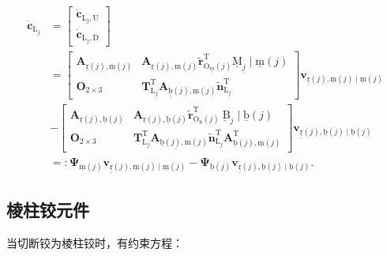 \[
\begin{aligned}
\dot{\boldsymbol{c}}_{\mathrm{L}_{j}} & =\left[\begin{array}{c}
\dot{\boldsymbol{c}}_{\mathrm{L}_{j}, \mathrm{U}} \\
\dot{\boldsymbol{c}}_{\mathrm{L}_{j}, \mathrm{D}}
\end{array}\right] \\
& =\left[\begin{array}{cc}
\boldsymbol{A}_{\underline{\mathrm{r}}(j), \underline{\mathrm{m}}(j)} & \boldsymbol{A}_{\underline{\mathrm{r}}(j), \underline{\mathrm{m}}(j)} \tilde{\boldsymbol{r}}_{\mathrm{O}_{\underline{\underline{m}}}(j)}^{\mathrm{T}} \underline{\mathrm{M}}_{\underline{j}} \mid \underline{\mathrm{m}}(j) \\
\boldsymbol{O}_{2 \times 3} & \boldsymbol{T}_{\mathrm{L}_{j}}^{\mathrm{T}} \boldsymbol{A}_{\underline{\underline{\mathrm{b}}}(j), \underline{\mathrm{m}}(j)} \tilde{\boldsymbol{n}}_{\mathrm{L}_{j}}^{\mathrm{T}}
\end{array}\right] \boldsymbol{v}_{\underline{\underline{\mathrm{r}}}(j), \underline{\mathrm{m}}(j) \mid \underline{\mathrm{m}}(j)} \\
& -\left[\begin{array}{cc}
\boldsymbol{A}_{\underline{\mathrm{r}}(j), \underline{\mathrm{b}}(j)} & \boldsymbol{A}_{\underline{\mathrm{r}}(j), \underline{\mathrm{b}}(j)} \tilde{\boldsymbol{r}}_{\mathrm{O}_{\mathrm{b}}(j)}^{\mathrm{T}} \underline{\mathrm{~B}}_{j} \mid \underline{\mathrm{b}}(j) \\
\boldsymbol{O}_{2 \times 3} & \boldsymbol{T}_{\mathrm{L}_{j}}^{\mathrm{T}} \boldsymbol{A}_{\underline{\underline{\mathrm{b}}(j), \mathrm{m}}(j)} \tilde{\boldsymbol{n}}_{\mathrm{L}_{j}}^{\mathrm{T}} \boldsymbol{A}_{\underline{\mathrm{b}}(j), \underline{\mathrm{m}}(j)}^{\mathrm{T}}
\end{array}\right] \boldsymbol{v}_{\underline{\underline{\mathrm{r}}}(j), \underline{\mathrm{b}}(j) \mid \underline{\mathrm{b}}(j)} \\
& =: \boldsymbol{\Psi}_{\underline{\mathrm{m}}(j)} \boldsymbol{v}_{\underline{\underline{\mathrm{r}}}(j), \underline{\mathrm{m}}(j) \mid \underline{\mathrm{m}}(j)}-\boldsymbol{\Psi}_{\underline{\mathrm{b}}(j)} \boldsymbol{v}_{\underline{\underline{\mathrm{r}}}(j), \underline{\mathrm{b}}(j) \mid \underline{\mathrm{b}}(j)} .
\end{aligned}
\]
\subsection{棱柱铰元件}
当切断铰为棱柱铰时，有约束方程：
